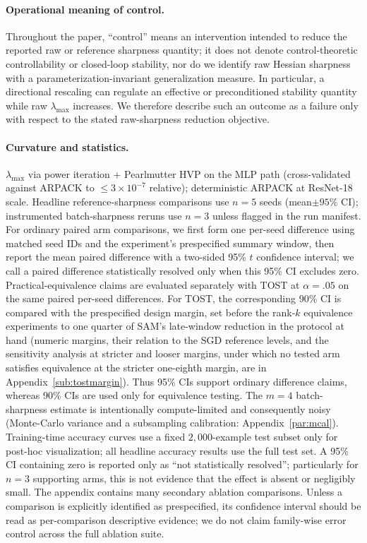 \documentclass{article}
\theoremstyle{plain}
\theoremstyle{definition}
\theoremstyle{remark}
\newcommand{\lmax}{\lambda_{\max}}
\begin{document}
\paragraph{Operational meaning of control.}
Throughout the paper, ``control'' means an intervention intended to
reduce the reported raw or reference sharpness quantity; it does not
denote control-theoretic controllability or closed-loop stability,
nor do we identify raw Hessian sharpness with a
parameterization-invariant generalization measure. In particular, a
directional rescaling can regulate an effective or preconditioned
stability quantity while raw $\lmax$ increases. We therefore describe
such an outcome as a failure only with respect to the stated
raw-sharpness reduction objective.

\paragraph{Curvature and statistics.} $\lmax$ via power iteration +
Pearlmutter HVP on the MLP path (cross-validated against ARPACK to
$\le3\times10^{-7}$ relative); deterministic ARPACK at ResNet-18
scale. Headline reference-sharpness comparisons use $n{=}5$ seeds
(mean$\pm 95\%$ CI); instrumented batch-sharpness reruns use $n{=}3$
unless flagged in the run manifest. For ordinary paired arm
comparisons, we first form one per-seed difference using matched seed
IDs and the experiment's prespecified summary window, then report the
mean paired difference with a two-sided 95\% $t$ confidence interval;
we call a paired difference statistically resolved only when this 95\%
CI excludes zero. Practical-equivalence claims are evaluated
separately with TOST at $\alpha{=}.05$ on the same paired per-seed
differences. For TOST, the corresponding 90\% CI is compared with the
prespecified design margin, set before the
rank-$k$ equivalence experiments to one quarter of SAM's
late-window reduction in the protocol at hand (numeric margins,
their relation to the SGD reference levels, and the sensitivity
analysis at stricter and looser margins, under which no tested arm
satisfies equivalence at the stricter one-eighth margin, are in
Appendix~\ref{sub:tostmargin}). Thus 95\% CIs support ordinary difference
claims, whereas 90\% CIs are used only for equivalence testing. The
$m{=}4$ batch-sharpness estimate is
intentionally compute-limited and consequently noisy (Monte-Carlo
variance and a subsampling calibration: Appendix~\ref{par:mcal}).
Training-time accuracy curves use a fixed $2{,}000$-example test subset only for
post-hoc visualization; all headline accuracy results use the full test
set. A 95\% CI containing zero is reported only as ``not statistically
resolved''; particularly for $n{=}3$ supporting arms, this is not
evidence that the effect is absent or negligibly small. The appendix
contains many secondary ablation comparisons. Unless a comparison is
explicitly identified as prespecified, its confidence interval should
be read as per-comparison descriptive evidence; we do not claim
family-wise error control across the full ablation suite.
\end{document}
